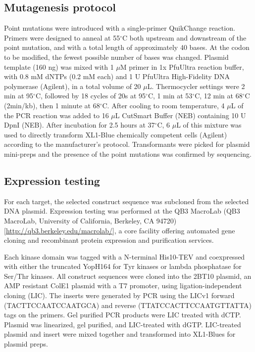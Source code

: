 \documentclass[phd,tocprelim]{cornell}
\begin{document}
\subsection{Mutagenesis protocol}

Point mutations were introduced with a single-primer QuikChange reaction. 
Primers were designed to anneal at 55$^{\circ}$C both upstream and downstream of the point mutation, and with a total length of approximately 40 bases. 
At the codon to be modified, the fewest possible number of bases was changed. 
Plasmid template (160 ng) was mixed with 1 $\mu$M primer in 1x PfuUltra reaction buffer, with 0.8 mM dNTPs (0.2 mM each) and 1 U PfuUltra High-Fidelity DNA polymerase (Agilent), in a total volume of 20 $\mu$L. 
Thermocycler settings were 2 min at 95$^{\circ}$C, followed by 18 cycles of 20s at 95$^{\circ}$C, 1 min at 53$^{\circ}$C, 12 min at 68$^{\circ}$C (2min/kb), then 1 minute at 68$^{\circ}$C. 
After cooling to room temperature, 4 $\mu$L of the PCR reaction was added to 16 $\mu$L CutSmart Buffer (NEB) containing 10 U DpnI (NEB). 
After incubation for 2.5 hours at 37$^{\circ}$C, 6 $\mu$L of this mixture was used to directly transform XL1-Blue chemically competent cells (Agilent) according to the manufacturer’s protocol. 
Transformants were picked for plasmid mini-preps and the presence of the point mutations was confirmed by sequencing.

\subsection{Expression testing}

For each target, the selected construct sequence was subcloned from the selected DNA plasmid.
Expression testing was performed at the QB3 MacroLab (QB3 MacroLab, University of California, Berkeley, CA 94720) [\url{http://qb3.berkeley.edu/macrolab/}], a core facility offering automated gene cloning and recombinant protein expression and purification services.

Each kinase domain was tagged with a N-terminal His10-TEV and coexpressed with either the truncated YopH164 for Tyr kinases or lambda phosphatase for Ser/Thr kinases.
All construct sequences were cloned into the 2BT10 plasmid, an AMP resistant ColE1 plasmid with a T7 promoter, using ligation-independent cloning (LIC).
The inserts were generated by PCR using the LICv1 forward (TACTTCCAATCCAATGCA) and reverse (TTATCCACTTCCAATGTTATTA) tags on the primers.
Gel purified PCR products were LIC treated with dCTP. 
Plasmid was linearized, gel purified, and LIC-treated with dGTP.
LIC-treated plasmid and insert were mixed together and transformed into XL1-Blues for plasmid preps. 
\end{document}
